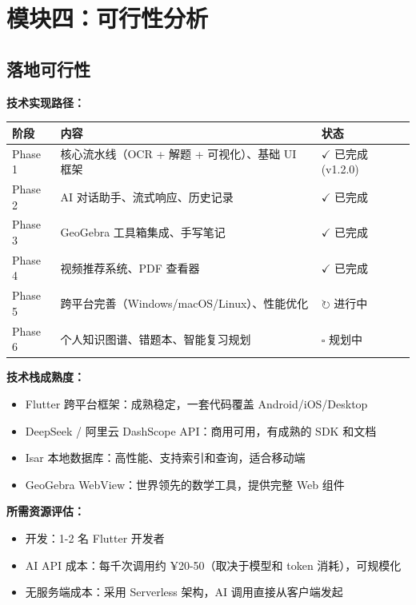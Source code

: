 \documentclass[12pt, a4paper]{ctexart}
\begin{document}
\section{模块四：可行性分析}

\subsection{落地可行性}
\textbf{技术实现路径：}
\begin{center}
\begin{tabular}{|p{2cm}|p{6cm}|p{3cm}|}
\hline
\textbf{阶段} & \textbf{内容} & \textbf{状态} \\ \hline
Phase 1 & 核心流水线（OCR + 解题 + 可视化）、基础 UI 框架 & $\checkmark$ 已完成 (v1.2.0) \\ \hline
Phase 2 & AI 对话助手、流式响应、历史记录 & $\checkmark$ 已完成 \\ \hline
Phase 3 & GeoGebra 工具箱集成、手写笔记 & $\checkmark$ 已完成 \\ \hline
Phase 4 & 视频推荐系统、PDF 查看器 & $\checkmark$ 已完成 \\ \hline
Phase 5 & 跨平台完善（Windows/macOS/Linux）、性能优化 & $\circlearrowright$ 进行中 \\ \hline
Phase 6 & 个人知识图谱、错题本、智能复习规划 & $\square$ 规划中 \\ \hline
\end{tabular}
\end{center}

\textbf{技术栈成熟度：}
\begin{itemize}
    \item Flutter 跨平台框架：成熟稳定，一套代码覆盖 Android/iOS/Desktop
    \item DeepSeek / 阿里云 DashScope API：商用可用，有成熟的 SDK 和文档
    \item Isar 本地数据库：高性能、支持索引和查询，适合移动端
    \item GeoGebra WebView：世界领先的数学工具，提供完整 Web 组件
\end{itemize}

\textbf{所需资源评估：}
\begin{itemize}
    \item 开发：1-2 名 Flutter 开发者
    \item AI API 成本：每千次调用约 ¥20-50（取决于模型和 token 消耗），可规模化
    \item 无服务端成本：采用 Serverless 架构，AI 调用直接从客户端发起
\end{itemize}
\end{document}
